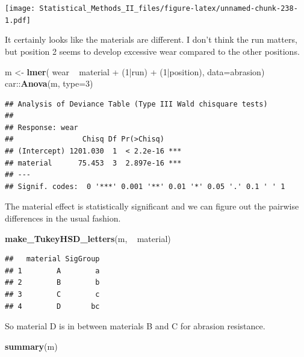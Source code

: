 \documentclass[]{book}
\newenvironment{Shaded}{\begin{snugshade}}{\end{snugshade}}
\newcommand{\KeywordTok}[1]{\textcolor[rgb]{0.13,0.29,0.53}{\textbf{{#1}}}}
\newcommand{\DataTypeTok}[1]{\textcolor[rgb]{0.13,0.29,0.53}{{#1}}}
\newcommand{\DecValTok}[1]{\textcolor[rgb]{0.00,0.00,0.81}{{#1}}}
\newcommand{\StringTok}[1]{\textcolor[rgb]{0.31,0.60,0.02}{{#1}}}
\newcommand{\NormalTok}[1]{{#1}}
\theoremstyle{definition}
\theoremstyle{definition}
\theoremstyle{remark}
\begin{document}
\texttt{[image: Statistical\_Methods\_II\_files/figure-latex/unnamed-chunk-238-1.pdf]}

It certainly looks like the materials are different. I don't think the
run matters, but position 2 seems to develop excessive wear compared to
the other positions.

\begin{Shaded}
\begin{Highlighting}[]
\NormalTok{m <-}\StringTok{ }\KeywordTok{lmer}\NormalTok{( wear ~}\StringTok{ }\NormalTok{material +}\StringTok{ }\NormalTok{(}\DecValTok{1}\NormalTok{|run) +}\StringTok{ }\NormalTok{(}\DecValTok{1}\NormalTok{|position), }\DataTypeTok{data=}\NormalTok{abrasion)}
\NormalTok{car::}\KeywordTok{Anova}\NormalTok{(m, }\DataTypeTok{type=}\DecValTok{3}\NormalTok{)}
\end{Highlighting}
\end{Shaded}

\begin{verbatim}
## Analysis of Deviance Table (Type III Wald chisquare tests)
## 
## Response: wear
##                Chisq Df Pr(>Chisq)    
## (Intercept) 1201.030  1  < 2.2e-16 ***
## material      75.453  3  2.897e-16 ***
## ---
## Signif. codes:  0 '***' 0.001 '**' 0.01 '*' 0.05 '.' 0.1 ' ' 1
\end{verbatim}

The material effect is statistically significant and we can figure out
the pairwise differences in the usual fashion.

\begin{Shaded}
\begin{Highlighting}[]
\KeywordTok{make_TukeyHSD_letters}\NormalTok{(m, ~}\StringTok{ }\NormalTok{material)}
\end{Highlighting}
\end{Shaded}

\begin{verbatim}
##   material SigGroup
## 1        A        a
## 2        B        b
## 3        C        c
## 4        D       bc
\end{verbatim}

So material D is in between materials B and C for abrasion resistance.

\begin{Shaded}
\begin{Highlighting}[]
\KeywordTok{summary}\NormalTok{(m)}
\end{Highlighting}
\end{Shaded}
\end{document}
